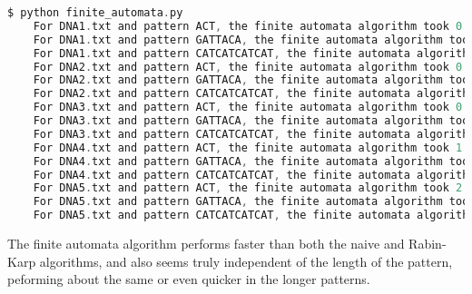 \documentclass[12pt]{article}
\newenvironment{problem}[2][Problem]{\begin{trivlist}
\item[\hskip \labelsep {\bfseries #1}\hskip \labelsep {\bfseries #2.}]}{\end{trivlist}}
\begin{document}
\begin{problem}{3}
\begin{lstlisting}[language=C, caption=Terminal output running code]
$ python finite_automata.py 
    For DNA1.txt and pattern ACT, the finite automata algorithm took 0.15551975400012452 seconds with 65495 matches
    For DNA1.txt and pattern GATTACA, the finite automata algorithm took 0.14494252900476567 seconds with 242 matches
    For DNA1.txt and pattern CATCATCATCAT, the finite automata algorithm took 0.14850315799412783 seconds with 0 matches
    For DNA2.txt and pattern ACT, the finite automata algorithm took 0.30578777501068544 seconds with 131034 matches
    For DNA2.txt and pattern GATTACA, the finite automata algorithm took 0.29742643699864857 seconds with 491 matches
    For DNA2.txt and pattern CATCATCATCAT, the finite automata algorithm took 0.2898057919956045 seconds with 1 matches
    For DNA3.txt and pattern ACT, the finite automata algorithm took 0.6287656860076822 seconds with 262192 matches
    For DNA3.txt and pattern GATTACA, the finite automata algorithm took 0.59431980199588 seconds with 1002 matches
    For DNA3.txt and pattern CATCATCATCAT, the finite automata algorithm took 0.5852815399994142 seconds with 1 matches
    For DNA4.txt and pattern ACT, the finite automata algorithm took 1.2557424819970038 seconds with 524454 matches
    For DNA4.txt and pattern GATTACA, the finite automata algorithm took 1.202983769995626 seconds with 1976 matches
    For DNA4.txt and pattern CATCATCATCAT, the finite automata algorithm took 1.1666112150123809 seconds with 5 matches
    For DNA5.txt and pattern ACT, the finite automata algorithm took 2.4493759730103193 seconds with 1050689 matches
    For DNA5.txt and pattern GATTACA, the finite automata algorithm took 2.3914340260089375 seconds with 4161 matches
    For DNA5.txt and pattern CATCATCATCAT, the finite automata algorithm took 2.339489956997568 seconds with 3 matches
\end{lstlisting}
The finite automata algorithm performs faster than both the naive and Rabin-Karp algorithms, and also seems truly independent of the length of the pattern, peforming about the same or even quicker in the longer patterns.
\end{problem}
\end{document}
